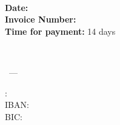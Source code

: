 \documentclass[onecolumn]{article} %
\begin{document}
\vspace{2cm}


\begin{multicols}{3}
\begin{flushleft}
\invoiceefullname\\
\invoiceecontact\\
\invoiceestreet\\
\invoiceezipcode~\invoiceecity\\
\invoiceecountry\\
\end{flushleft}


\columnbreak
\begin{flushleft}
\vfill
\end{flushleft}
\vspace{2cm}

\columnbreak
\begin{flushleft}
\vspace*{1cm}
\myfullname\\
\mystreet\\
\myzipcode~\mycity\\
\myphone\\
\href{\mywebsite}{\mywebsite}\\
\href{\myemail}{\myemail}\\
\end{flushleft}

\end{multicols}

\begin{flushright}
\textbf{Date:} \invoicedate\\
\textbf{Invoice Number:} \invoicenumber\\
\textbf{Time for payment:} 14 days\\
\end{flushright}

\begin{flushleft}
\begin{LARGE}
\trinvoice \invoicenumber\\
\end{LARGE}

\trperformanceperiod \invoiceperiodbegin~---~\invoiceperiodend

\vspace{1.0cm}

\trsalutationtext

\begin{positiontable}
\end{positiontable}



\trpaymentrequesttext

\begin{tabbing}
\traccountholder: \= \textbf{\myfullname}\\
IBAN: \> \textbf{\myiban}\\
BIC: \> \textbf{\mybic}\\
\end{tabbing}
\vspace{0.25cm}

\trclosing
\break
\break
\myfullname

\end{flushleft}
\end{document}
